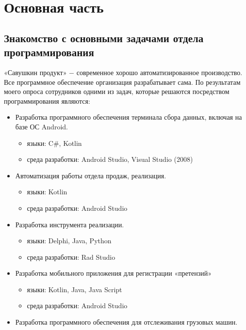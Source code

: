 \chapter{Основная часть}
\label{ch:chap1}

\section{Знакомство с основными задачами отдела программирования}

«Савушкин продукт» $-$ современное хорошо автоматизированное производство. Все программное обеспечение организация разрабатывает сама.
По результатам моего опроса сотрудников одними из задач, которые решаются посредством программирования являются:

\begin{itemize}
    \item Разработка программного обеспечения терминала сбора данных, включая на базе ОС Android.
    \begin{itemize}
        \item языки: C\#, Kotlin
        \item среда разработки: Android Studio, Visual Studio (2008)
    \end{itemize}
    \item Автоматизация работы отдела продаж, реализация.
    \begin{itemize}
        \item языки: Kotlin
        \item среда разработки: Android Studio
    \end{itemize}
    \item Разработка инструмента реализации.
     \begin {itemize}
     \item языки: Delphi, Java, Python
     \item  среда разработки: Rad Studio
     \end{itemize}
  \item Разработка мобильного приложения для регистрации «претензий»
   \begin{itemize} 
       \item языки:  Kotlin, Java, Java Script
       \item среда разработки: Android Studio
   \end{itemize}
   \item Разработка программного обеспечения для отслеживания грузовых машин.
   \begin{itemize}

\end{itemize}
\end{itemize}
